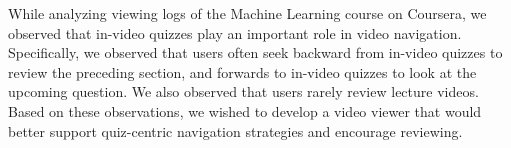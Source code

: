 \documentclass{sigchi}
\begin{document}
While analyzing viewing logs of the Machine Learning course on Coursera, we observed that in-video quizzes play an important role in video navigation. Specifically, we observed that users often seek backward from in-video quizzes to review the preceding section, and forwards to in-video quizzes to look at the upcoming question. We also observed that users rarely review lecture videos. Based on these observations, we wished to develop a video viewer that would better support quiz-centric navigation strategies and encourage reviewing.





\end{document}
